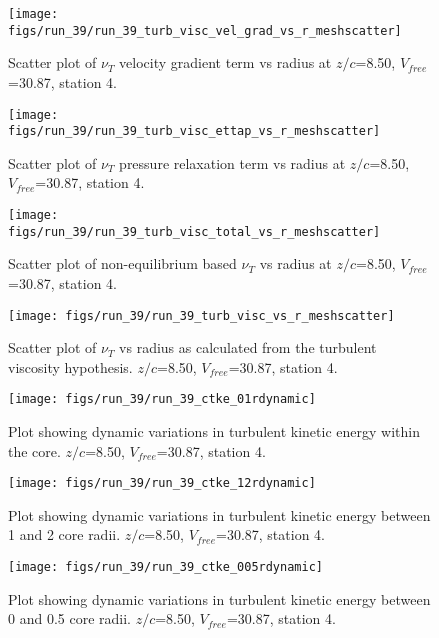 \begin{figure}[H]
\centering
\texttt{[image: figs/run\_39/run\_39\_turb\_visc\_vel\_grad\_vs\_r\_meshscatter]}
\caption{Scatter plot of $\nu_T$ velocity gradient term vs radius at $z/c$=8.50, $V_{free}$=30.87, station 4.}
\end{figure}


\begin{figure}[H]
\centering
\texttt{[image: figs/run\_39/run\_39\_turb\_visc\_ettap\_vs\_r\_meshscatter]}
\caption{Scatter plot of $\nu_T$ pressure relaxation term vs radius at $z/c$=8.50, $V_{free}$=30.87, station 4.}
\end{figure}


\begin{figure}[H]
\centering
\texttt{[image: figs/run\_39/run\_39\_turb\_visc\_total\_vs\_r\_meshscatter]}
\caption{Scatter plot of non-equilibrium based $\nu_T$ vs radius at $z/c$=8.50, $V_{free}$=30.87, station 4.}
\end{figure}


\begin{figure}[H]
\centering
\texttt{[image: figs/run\_39/run\_39\_turb\_visc\_vs\_r\_meshscatter]}
\caption{Scatter plot of $\nu_T$ vs radius as calculated from the turbulent viscosity hypothesis. $z/c$=8.50, $V_{free}$=30.87, station 4.}
\end{figure}


\begin{figure}[H]
\centering
\texttt{[image: figs/run\_39/run\_39\_ctke\_01rdynamic]}
\caption{Plot showing dynamic variations in turbulent kinetic energy within the core. $z/c$=8.50, $V_{free}$=30.87, station 4.}
\end{figure}


\begin{figure}[H]
\centering
\texttt{[image: figs/run\_39/run\_39\_ctke\_12rdynamic]}
\caption{Plot showing dynamic variations in turbulent kinetic energy between 1 and 2 core radii. $z/c$=8.50, $V_{free}$=30.87, station 4.}
\end{figure}


\begin{figure}[H]
\centering
\texttt{[image: figs/run\_39/run\_39\_ctke\_005rdynamic]}
\caption{Plot showing dynamic variations in turbulent kinetic energy between 0 and 0.5 core radii. $z/c$=8.50, $V_{free}$=30.87, station 4.}
\end{figure}


